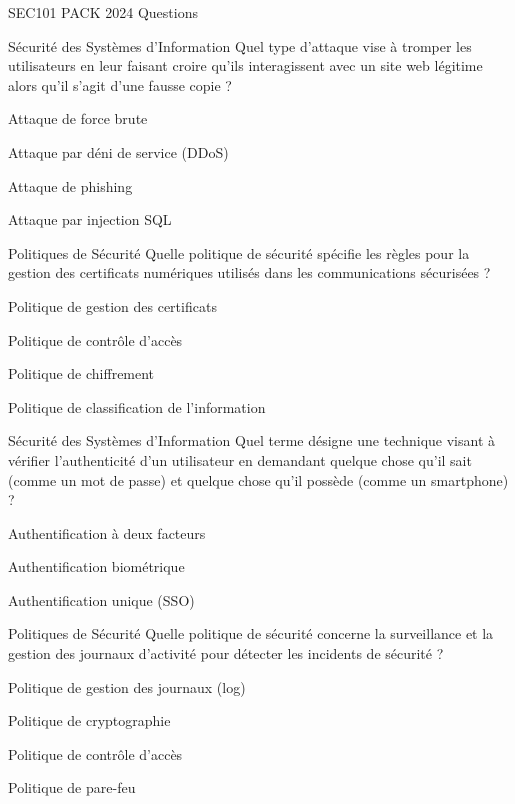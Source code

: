 \documentclass[12pt]{article}
\begin{document}
\begin{quiz}{SEC101 PACK 2024 Questions}
\begin{multi}[points=1]{Sécurité des Systèmes d'Information}
  Quel type d'attaque vise à tromper les utilisateurs en leur faisant croire qu'ils interagissent avec un site web légitime alors qu'il s'agit d'une fausse copie ?
  \item Attaque de force brute
  \item Attaque par déni de service (DDoS)
  \item* Attaque de phishing
  \item Attaque par injection SQL
\end{multi}

\begin{multi}[points=1]{Politiques de Sécurité}
  Quelle politique de sécurité spécifie les règles pour la gestion des certificats numériques utilisés dans les communications sécurisées ?
  \item* Politique de gestion des certificats
  \item Politique de contrôle d'accès
  \item Politique de chiffrement
  \item Politique de classification de l'information
\end{multi}


\begin{multi}[points=1]{Sécurité des Systèmes d'Information}
    Quel terme désigne une technique visant à vérifier l'authenticité d'un utilisateur en demandant quelque chose qu'il sait (comme un mot de passe) et quelque chose qu'il possède (comme un smartphone) ?
    \item* Authentification à deux facteurs
    \item Authentification biométrique
    \item Authentification unique (SSO)
  \end{multi}

  \begin{multi}[points=1]{Politiques de Sécurité}
    Quelle politique de sécurité concerne la surveillance et la gestion des journaux d'activité pour détecter les incidents de sécurité ?
    \item* Politique de gestion des journaux (log)
    \item Politique de cryptographie
    \item Politique de contrôle d'accès
    \item Politique de pare-feu
  \end{multi}


\end{quiz}
\end{document}
